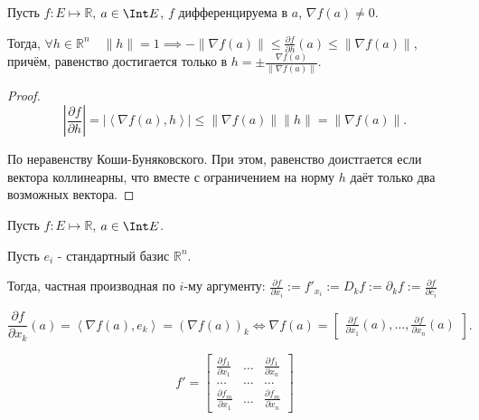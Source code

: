 \begin{consequence} \thmslashn

    Пусть $f : E \mapsto \mathbb{R}$, $a\in \Int E$, $f$ дифференцируема в $a$, $\nabla f(a) \neq 0$.

    Тогда, $\forall{h\in \mathbb{R}^{n}}\quad \|h\| = 1 \implies - \|\nabla f(a)\| \le \frac{\partial f}{\partial h}(a) \le \|\nabla f(a)\|$, причём, равенство достигается только в $h = \pm \frac{\nabla f(a)}{\|\nabla f(a)\|}$.
    \begin{proof} \thmslashn
    
        \[ \left| \frac{\partial f}{\partial h} \right| = \left| \left<\nabla f(a), h\right>\right| \le \|\nabla f(a)\| \|h\| = \|\nabla f(a)\| .\]

        По неравенству Коши-Буняковского. При этом, равенство доистгается если вектора коллинеарны, что вместе с ограничением на норму $h$ даёт только два возможных вектора.
    \end{proof}
\end{consequence}
\begin{definition} \thmslashn 

    Пусть $f : E \mapsto \mathbb{R}$, $a\in \Int E$.

    Пусть $e_{i}$ - стандартный базис $\mathbb{R}^{n}$.

    Тогда, частная производная по $i$-му аргументу: $\frac{\partial f}{\partial x_{i}}  := f'_{x_{i}} := D_{k}f := \partial_{k}f := \frac{\partial f}{\partial e_{i}} $ 
\end{definition}
\begin{consequence} \thmslashn

    \[ \frac{\partial f}{\partial x_{k}}(a) = \left<\nabla f(a), e_{k}\right> = (\nabla f(a))_{k} \iff \nabla f(a) = \begin{bmatrix} \frac{\partial f}{\partial x_1}(a), \ldots, \frac{\partial f}{\partial x_{n}}(a)   \end{bmatrix}   .\] 
\end{consequence}
\begin{consequence} \thmslashn

    \begin{equation*}
        f' = 
        \begin{bmatrix} 
            \frac{\partial f_1}{\partial x_1} & \ldots & \frac{\partial f_1}{\partial x_{n}}\\
            \ldots & \ldots & \ldots\\
            \frac{\partial f_{m}}{\partial x_{1}} & \ldots & \frac{\partial f_{m}}{\partial x_{n}}  
        \end{bmatrix} 
    \end{equation*}
\end{consequence}
